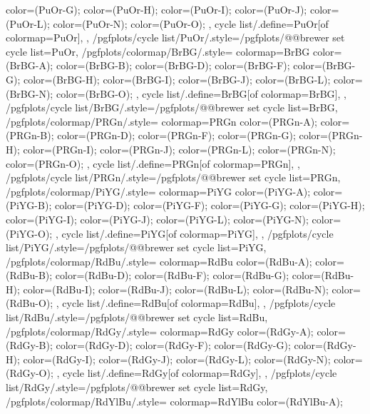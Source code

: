 {{{      color=(PuOr-G);
      color=(PuOr-H);
      color=(PuOr-I);
      color=(PuOr-J);
      color=(PuOr-L);
      color=(PuOr-N);
      color=(PuOr-O);
    },
    cycle list/.define={PuOr}{[of colormap=PuOr]},
  },
  /pgfplots/cycle list/PuOr/.style={/pgfplots/@@brewer set cycle list={PuOr}},
  /pgfplots/colormap/BrBG/.style={
    colormap={BrBG}{
      color=(BrBG-A);
      color=(BrBG-B);
      color=(BrBG-D);
      color=(BrBG-F);
      color=(BrBG-G);
      color=(BrBG-H);
      color=(BrBG-I);
      color=(BrBG-J);
      color=(BrBG-L);
      color=(BrBG-N);
      color=(BrBG-O);
    },
    cycle list/.define={BrBG}{[of colormap=BrBG]},
  },
  /pgfplots/cycle list/BrBG/.style={/pgfplots/@@brewer set cycle list={BrBG}},
  /pgfplots/colormap/PRGn/.style={
    colormap={PRGn}{
      color=(PRGn-A);
      color=(PRGn-B);
      color=(PRGn-D);
      color=(PRGn-F);
      color=(PRGn-G);
      color=(PRGn-H);
      color=(PRGn-I);
      color=(PRGn-J);
      color=(PRGn-L);
      color=(PRGn-N);
      color=(PRGn-O);
    },
    cycle list/.define={PRGn}{[of colormap=PRGn]},
  },
  /pgfplots/cycle list/PRGn/.style={/pgfplots/@@brewer set cycle list={PRGn}},
  /pgfplots/colormap/PiYG/.style={
    colormap={PiYG}{
      color=(PiYG-A);
      color=(PiYG-B);
      color=(PiYG-D);
      color=(PiYG-F);
      color=(PiYG-G);
      color=(PiYG-H);
      color=(PiYG-I);
      color=(PiYG-J);
      color=(PiYG-L);
      color=(PiYG-N);
      color=(PiYG-O);
    },
    cycle list/.define={PiYG}{[of colormap=PiYG]},
  },
  /pgfplots/cycle list/PiYG/.style={/pgfplots/@@brewer set cycle list={PiYG}},
  /pgfplots/colormap/RdBu/.style={
    colormap={RdBu}{
      color=(RdBu-A);
      color=(RdBu-B);
      color=(RdBu-D);
      color=(RdBu-F);
      color=(RdBu-G);
      color=(RdBu-H);
      color=(RdBu-I);
      color=(RdBu-J);
      color=(RdBu-L);
      color=(RdBu-N);
      color=(RdBu-O);
    },
    cycle list/.define={RdBu}{[of colormap=RdBu]},
  },
  /pgfplots/cycle list/RdBu/.style={/pgfplots/@@brewer set cycle list={RdBu}},
  /pgfplots/colormap/RdGy/.style={
    colormap={RdGy}{
      color=(RdGy-A);
      color=(RdGy-B);
      color=(RdGy-D);
      color=(RdGy-F);
      color=(RdGy-G);
      color=(RdGy-H);
      color=(RdGy-I);
      color=(RdGy-J);
      color=(RdGy-L);
      color=(RdGy-N);
      color=(RdGy-O);
    },
    cycle list/.define={RdGy}{[of colormap=RdGy]},
  },
  /pgfplots/cycle list/RdGy/.style={/pgfplots/@@brewer set cycle list={RdGy}},
  /pgfplots/colormap/RdYlBu/.style={
    colormap={RdYlBu}{
      color=(RdYlBu-A);
}}}
